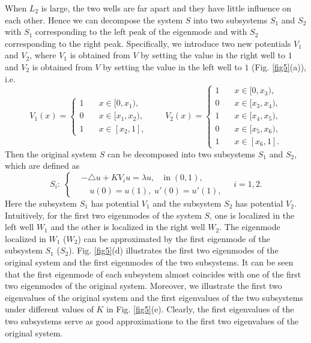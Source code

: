 \documentclass[a4paper,11pt]{article}
\begin{document}
When $L_2$ is large, the two wells are far apart and they have little influence on each other. Hence we can decompose the system $S$ into two subsystems $S_1$ and $S_2$ with $S_1$ corresponding to the left peak of the eigenmode and with $S_2$ corresponding to the right peak. Specifically, we introduce two new potentials $V_1$ and $V_2$, where $V_1$ is obtained from $V$ by setting the value in the right well to $1$ and $V_2$ is obtained from $V$ by setting the value in the left well to $1$ (Fig. \ref{fig5}(a)), i.e.
\begin{equation*}
V_1(x) = \left\{
\begin{split}
1 & \quad x \in [0, x_1), \\
0 & \quad x \in [x_1, x_2), \\
1 & \quad x \in [x_2, 1],
\end{split}
\right.
\qquad
V_2(x) = \left\{
\begin{split}
1 & \quad x \in [0, x_3), \\
0 & \quad x \in [x_3, x_4), \\
1 & \quad x \in [x_4, x_5), \\
0 & \quad x \in [x_5, x_6), \\
1 & \quad x \in [x_6, 1].
\end{split}
\right.
\end{equation*}
Then the original system $S$ can be decomposed into two subsystems $S_1$ and $S_2$, which are defined as
\begin{equation}
S_i: \;
\left\{
\begin{split}
& -\triangle u + K V_i u = \lambda u, \quad \textrm{in} \; (0, 1), \\
& \quad u(0) = u(1), \; u'(0) =  u'(1),
\end{split}
\right.
\quad
i = 1, 2.
\end{equation}
Here the subsystem $S_1$ has potential $V_1$ and the subsystem $S_2$ has potential $V_2$. Intuitively, for the first two eigenmodes of the system $S$, one is localized in the left well $W_1$ and the other is localized in the right well $W_2$. The eigenmode localized in $W_1$ ($W_2$) can be approximated by the first eigenmode of the subsystem $S_1$ ($S_2$). Fig. \ref{fig5}(d) illustrates the first two eigenmodes of the original system and the first eigenmodes of the two subsystems. It can be seen that the first eigenmode of each subsystem almost coincides with one of the first two eigenmodes of the original system. Moreover, we illustrate the first two eigenvalues of the original system and the first eigenvalues of the two subsystems under different values of $K$ in Fig. \ref{fig5}(e). Clearly, the first eigenvalues of the two subsystems serve as good approximations to the first two eigenvalues of the original system.
\end{document}
